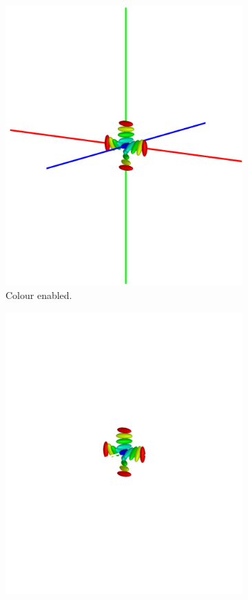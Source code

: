 \begin{figure}
\begin{center}
\begin{subfigure}{0.4\textwidth}
      \includegraphics[width=\linewidth]{assets/images/axes/2_colour}
      \caption{Colour enabled.}
      \label{fig:original_axes_colour}
    \end{subfigure}
    \begin{subfigure}{0.4\textwidth}
      \includegraphics[width=\linewidth]{assets/images/axes/2_no_colour_bad}

\end{subfigure}
\end{center}
\end{figure}
